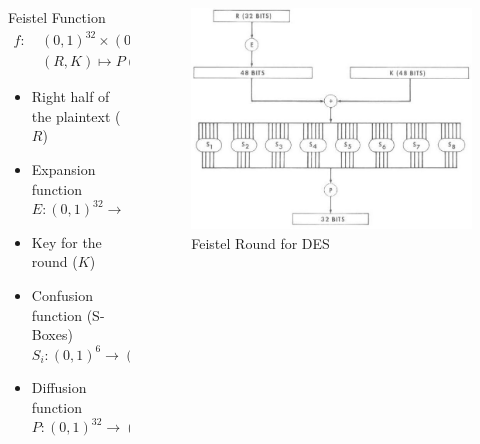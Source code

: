 \documentclass[9pt]{beamer}
\begin{document}
\begin{frame}
\begin{columns}
\begin{column}{0.45\textwidth}
\begin{block}{Feistel Function}
\begin{align*}
f : \: & (0,1)^{32} \times (0,1)^{48} \rightarrow (0,1)^{32} \\
& (R,K)  \mapsto P (S_{Box}(E(R) \oplus K)) 
\end{align*}
\end{block}

\begin{itemize}
\item{Right half of the plaintext ($R$)}
\item{Expansion function \\ $E : (0,1)^{32} \rightarrow (0,1)^{48}$}
\item{Key for the round ($K$)}
\item{Confusion function (S-Boxes) \\ $S_i: (0,1)^6 \rightarrow (0,1)^4$}
\item{Diffusion function \\ $P : (0,1)^{32} \rightarrow (0,1)^{32}$}
\end{itemize}
\end{column}
\begin{column}{0.55\textwidth}
\begin{figure}
\includegraphics[totalheight=0.6\textheight]{des_feistel.jpg}
\caption{Feistel Round for DES}
\end{figure}
\end{column}
\end{columns}
\end{frame}
\end{document}
